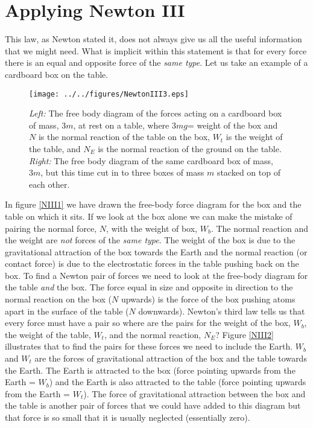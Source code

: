 \section{Applying Newton III}
This law, as Newton stated it, does not always give us all the useful information that we might need.  What is implicit within this statement is that for every force there is an equal and opposite force of the {\it same type}.  Let us take an example of a cardboard box on the table. \nl
\begin{wrapfigure}{r!}{8cm}
\center
\texttt{[image: ../../figures/NewtonIII3.eps]}
\caption{{\it Left:} The free body diagram of the forces acting on a cardboard box of mass, $3m$, at rest on a table, where $3mg$= weight of the box and $N$ is the normal reaction of the table on the box, $W_t$ is the weight of the table, and $N_E$ is the normal reaction of the ground on the table.\\
{\it Right:}  The free body diagram of the same cardboard box of mass, $3m$,  but this time cut in to three boxes of mass $m$ stacked on top of each other. } \label{NIII3}
\end{wrapfigure}
In figure \ref{NIII1} we have drawn the free-body force diagram for the box and the table on which it sits.  If we look at the box alone we can make the mistake of pairing the normal force, $N$,  with the weight of box, $W_b$.  The normal reaction and the weight are {\it not} forces of the {\it same type}. The weight of the box is due to the gravitational attraction of the box towards the Earth and the normal reaction (or contact force) is due to the electrostatic forces in the table pushing back on the box. To find a Newton pair of forces we need to look at the free-body diagram for the table {\it and} the box. The force equal in size and opposite in direction to the normal reaction on the box ($N$ upwards) is the force of the box pushing atoms apart in the surface of the table ($N$ downwards).\nl
Newton's third law tells us that every force must have a pair so where are the pairs for the weight of the box, $W_b$, the weight of the table, $W_t$, and the normal reaction, $N_E$?  Figure \ref{NIII2} illustrates that to find the pairs for these forces we need to include the Earth.   $W_b$ and $W_t$ are the forces of gravitational attraction of the box and the table towards the Earth.  The Earth is attracted to the box (force pointing upwards from the Earth = $W_b$) and the Earth is also attracted to the table (force pointing upwards from the Earth = $W_t$).\nl
The force of gravitational attraction between the box and the table is another pair of forces that we could have added to this diagram but that force is so small that it is usually neglected (essentially zero).

